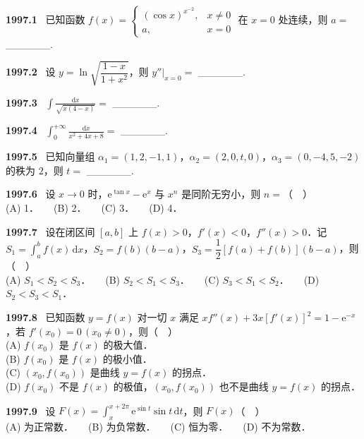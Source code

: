 \documentclass[UTF8,12pt]{ctexart}
\newcommand{\qn}[1]{\textbf{\large #1}\ }
\begin{document}
\qn{1997.1}
已知函数 $f(x)=\begin{cases} (\cos x)^{x^{-2}}, & x\neq 0\\ a, & x=0 \end{cases}$ 在 $x=0$ 处连续，则 $a=$ ______.

\vfill
\newpage
\qn{1997.2}
设 $y=\ln\sqrt{\dfrac{1-x}{1+x^2}}$，则 $\left.y''\right|_{x=0}=$ ______.

\vfill
\newpage
\qn{1997.3}
$\displaystyle\int\frac{\mathrm{d}x}{\sqrt{x(4-x)}}=$ ______.

\vfill
\newpage
\qn{1997.4}
$\displaystyle\int_0^{+\infty}\frac{\mathrm{d}x}{x^2+4x+8}=$ ______.

\vfill
\newpage
\qn{1997.5}
已知向量组 $\alpha_1=(1,2,-1,1)$，$\alpha_2=(2,0,t,0)$，$\alpha_3=(0,-4,5,-2)$ 的秩为 $2$，则 $t=$ ______.

\vfill
\newpage
\qn{1997.6}
设 $x\to 0$ 时，$\mathrm{e}^{\tan x}-\mathrm{e}^x$ 与 $x^n$ 是同阶无穷小，则 $n=$（　）
\\
\noindent (A) 1．　　(B) 2．　　(C) 3．　　(D) 4．

\vfill
\newpage
\qn{1997.7}
设在闭区间 $[a,b]$ 上 $f(x)>0$，$f'(x)<0$，$f''(x)>0$．记 $S_1=\int_a^b f(x)\,\mathrm{d}x$，$S_2=f(b)(b-a)$，$S_3=\dfrac{1}{2}[f(a)+f(b)](b-a)$，则（　）
\\
\noindent (A) $S_1<S_2<S_3$．　　(B) $S_2<S_1<S_3$．　　(C) $S_3<S_1<S_2$．　　(D) $S_2<S_3<S_1$．

\vfill
\newpage
\qn{1997.8}
已知函数 $y=f(x)$ 对一切 $x$ 满足 $xf''(x)+3x[f'(x)]^2=1-\mathrm{e}^{-x}$，若 $f'(x_0)=0\,(x_0\neq 0)$，则（　）
\\
\noindent (A) $f(x_0)$ 是 $f(x)$ 的极大值．
\\
\noindent (B) $f(x_0)$ 是 $f(x)$ 的极小值．
\\
\noindent (C) $(x_0,f(x_0))$ 是曲线 $y=f(x)$ 的拐点．
\\
\noindent (D) $f(x_0)$ 不是 $f(x)$ 的极值，$(x_0,f(x_0))$ 也不是曲线 $y=f(x)$ 的拐点．

\vfill
\newpage
\qn{1997.9}
设 $F(x)=\displaystyle\int_x^{x+2\pi}\mathrm{e}^{\sin t}\sin t\,\mathrm{d}t$，则 $F(x)$（　）
\\
\noindent (A) 为正常数．　　(B) 为负常数．　　(C) 恒为零．　　(D) 不为常数．
\end{document}
